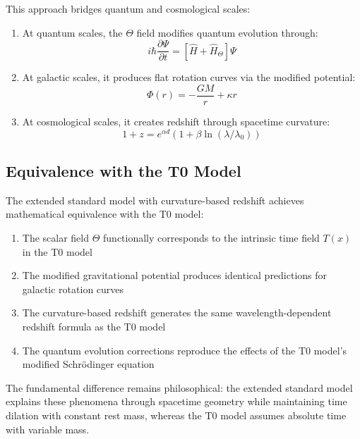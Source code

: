 \documentclass[12pt,a4paper]{article}
\begin{document}
	This approach bridges quantum and cosmological scales:
	
	\begin{enumerate}
		\item At quantum scales, the $\Theta$ field modifies quantum evolution through:
		\begin{equation}
			i\hbar\frac{\partial\Psi}{\partial t} = [\hat{H} + \hat{H}_{\Theta}]\Psi
		\end{equation}
		
		\item At galactic scales, it produces flat rotation curves via the modified potential:
		\begin{equation}
			\Phi(r) = -\frac{GM}{r} + \kappa r
		\end{equation}
		
		\item At cosmological scales, it creates redshift through spacetime curvature:
		\begin{equation}
			1 + z = e^{\alpha d}(1 + \beta \ln(\lambda/\lambda_0))
		\end{equation}
	\end{enumerate}
	
	\subsection{Equivalence with the T0 Model}
	
	The extended standard model with curvature-based redshift achieves mathematical equivalence with the T0 model:
	
	\begin{enumerate}
		\item The scalar field $\Theta$ functionally corresponds to the intrinsic time field $T(x)$ in the T0 model
		\item The modified gravitational potential produces identical predictions for galactic rotation curves
		\item The curvature-based redshift generates the same wavelength-dependent redshift formula as the T0 model
		\item The quantum evolution corrections reproduce the effects of the T0 model's modified Schrödinger equation
	\end{enumerate}
	
	The fundamental difference remains philosophical: the extended standard model explains these phenomena through spacetime geometry while maintaining time dilation with constant rest mass, whereas the T0 model assumes absolute time with variable mass.
	
\end{document}
